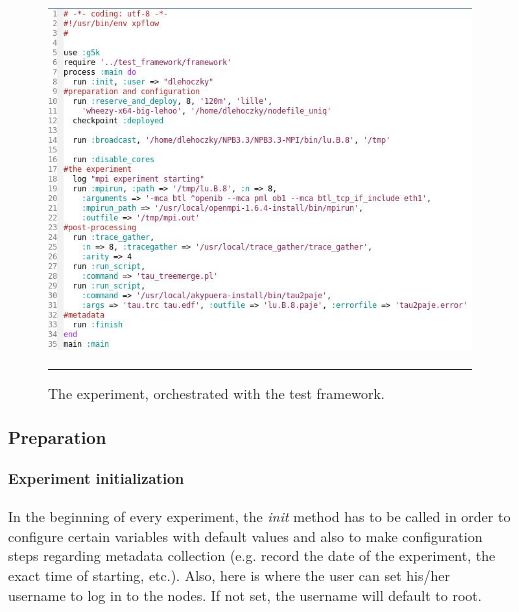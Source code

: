 \begin{figure}[htbp]
  \centering
    \includegraphics[scale=0.7]{./Figures/experiment_code.jpg}
    \rule{35em}{0.5pt}
  \caption[Experiment code]{The experiment, orchestrated with the test
    framework.}
  \label{fig:experiment_code}
\end{figure}

\subsubsection{Preparation}
\paragraph{Experiment initialization}
In the beginning of every experiment, the \emph{init} method has to be
called in order to configure certain variables with default values and
also to make configuration steps regarding metadata collection
(e.g. record the date of the experiment, the exact time of starting,
etc.). Also, here is where the user can set his/her username to log in
to the nodes. If not set, the username will default to root.
